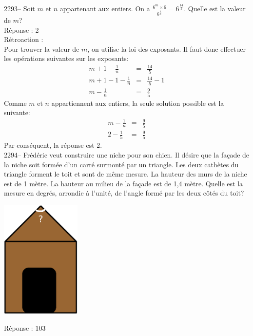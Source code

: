 \documentclass[letterpaper, 12pt]{article}
\begin{document}
2293-- Soit $m$ et $n$ appartenant aux entiers. On a $\frac{6^{m}\times6}{6^{\frac{1}{n}}}=6^{\frac{14}{5}}$. Quelle est la valeur de $m$?\\

R\'eponse : 2\\

R\'etroaction :\\
Pour trouver la valeur de $m$, on utilise la loi des exposants. Il faut donc effectuer les op\'erations suivantes sur les exposants:
\begin{eqnarray*}
m+1-\frac{1}{n}&=&\frac{14}{5}\\[2mm]
m+1-1-\frac{1}{n}&=&\frac{14}{5}-1\\[2mm]
m-\frac{1}{n}&=&\frac{9}{5}
\end{eqnarray*}
Comme $m$ et $n$ appartiennent aux entiers, la seule solution possible est la suivante:
\begin{eqnarray*}
m-\frac{1}{n}&=&\frac{9}{5}\\[2mm]
2-\frac{1}{5}&=&\frac{9}{5}
\end{eqnarray*}
Par cons\'equent, la r\'eponse est 2.\\

2294-- Fr\'ed\'eric veut construire une niche pour son chien. Il d\'esire que la fa\c cade de la niche soit form\'ee d'un carr\'e surmont\'e par un triangle. Les deux cath\`etes du triangle forment le toit et sont de m\^eme mesure. La hauteur des murs de la niche est de 1 m\`etre. La hauteur au milieu de la fa\c cade est de 1,4 m\`etre. Quelle est la mesure en degr\'es, arrondie \`a l'unit\'e, de l'angle form\'e par les deux c\^ot\'es du toit?
\begin{center}
 \includegraphics[width=4cm,bb=14 14 627 807]{Niche2294.eps}
\end{center}

R\'eponse : 103\\
\end{document}

